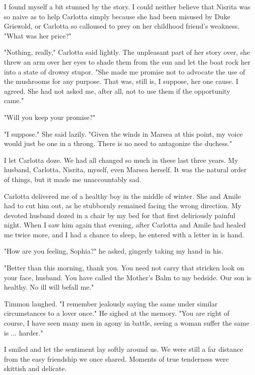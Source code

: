 \documentclass{article}
\begin{document}
I found myself a bit stunned by the story. I could neither believe that Nisrita was so naive as to help Carlotta simply because she had been misused by Duke Griswold, or Carlotta so calloused to prey on her childhood friend's weakness. "What was her price?"

"Nothing, really," Carlotta said lightly. The unpleasant part of her story over, she threw an arm over her eyes to shade them from the sun and let the boat rock her into a state of drowsy stupor. "She made me promise not to advocate the use of the mushrooms for any purpose. That was, still is, I suppose, her one cause. I agreed. She had not asked me, after all, not to use them if the opportunity came." 

"Will you keep your promise?"

"I suppose." She said lazily. "Given the winds in Marsea at this point, my voice would just be one in a throng. There is no need to antagonize the duchess."

I let Carlotta doze. We had all changed so much in these last three years. My husband, Carlotta, Nisrita, myself, even Marsea herself. It was the natural order of things, but it made me unaccountably sad.

\vspace{.5cm} 
Carlotta delivered me of a healthy boy in the middle of winter. She and Amile had to cut him out, as he stubbornly remained facing the wrong direction. My devoted husband dozed in a chair by my bed for that first deliriously painful night. When I saw him again that evening, after Carlotta and Amile had healed me twice more, and I had a chance to sleep, he entered with a letter in is hand.  

"How are you feeling, Sophia?" he asked, gingerly taking my hand in his.

"Better than this morning, thank you. You need not carry that stricken look on your face, husband. You have called the Mother's Balm to my bedside. Our son is healthy. No ill will befall me." 

Timmon laughed. "I remember jealously saying the same under similar circumstances to a lover once." He sighed at the memory. "You are right of course, I have seen many men in agony in battle, seeing a woman suffer the same is ... harder."

I smiled and let the sentiment lay softly around us. We were still a far distance from the easy friendship we once shared. Moments of true tenderness were skittish and delicate. 
\end{document}

